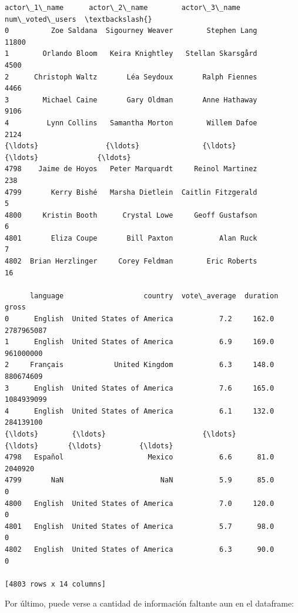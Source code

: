 \begin{tcolorbox}[breakable, boxrule=.5pt, size=fbox, pad at break*=1mm, opacityfill=0]
\begin{Verbatim}[commandchars=\\\{\}]
          actor\_1\_name      actor\_2\_name        actor\_3\_name  num\_voted\_users  \textbackslash{}
0          Zoe Saldana  Sigourney Weaver        Stephen Lang            11800
1        Orlando Bloom   Keira Knightley   Stellan Skarsgård             4500
2      Christoph Waltz       Léa Seydoux       Ralph Fiennes             4466
3        Michael Caine       Gary Oldman       Anne Hathaway             9106
4         Lynn Collins   Samantha Morton        Willem Dafoe             2124
{\ldots}                {\ldots}               {\ldots}                 {\ldots}              {\ldots}
4798    Jaime de Hoyos   Peter Marquardt     Reinol Martinez              238
4799       Kerry Bishé   Marsha Dietlein  Caitlin Fitzgerald                5
4800     Kristin Booth      Crystal Lowe     Geoff Gustafson                6
4801       Eliza Coupe       Bill Paxton           Alan Ruck                7
4802  Brian Herzlinger     Corey Feldman        Eric Roberts               16

      language                   country  vote\_average  duration       gross
0      English  United States of America           7.2     162.0  2787965087
1      English  United States of America           6.9     169.0   961000000
2     Français            United Kingdom           6.3     148.0   880674609
3      English  United States of America           7.6     165.0  1084939099
4      English  United States of America           6.1     132.0   284139100
{\ldots}        {\ldots}                       {\ldots}           {\ldots}       {\ldots}         {\ldots}
4798   Español                    Mexico           6.6      81.0     2040920
4799       NaN                       NaN           5.9      85.0           0
4800   English  United States of America           7.0     120.0           0
4801   English  United States of America           5.7      98.0           0
4802   English  United States of America           6.3      90.0           0

[4803 rows x 14 columns]
\end{Verbatim}
\end{tcolorbox}
        
    Por último, puede verse a cantidad de información faltante aun en el
dataframe:

